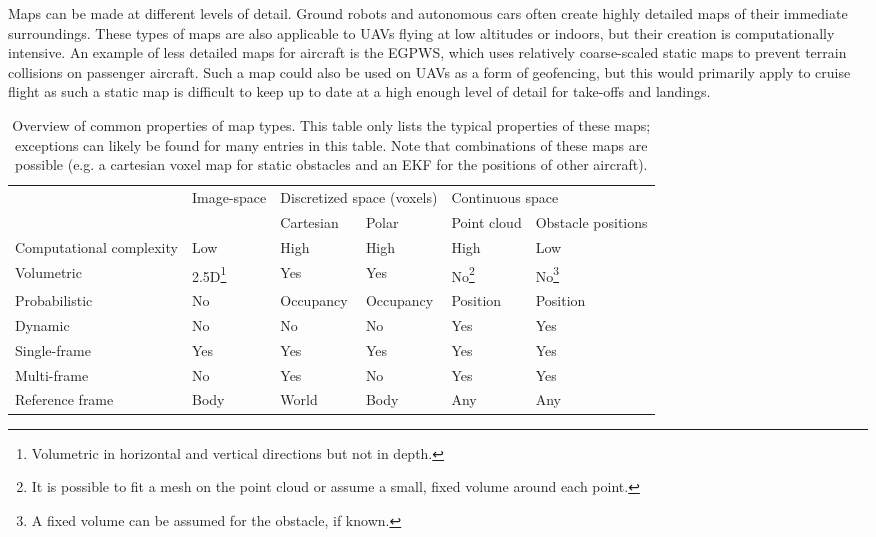 Maps can be made at different levels of detail.
Ground robots and autonomous cars often create highly detailed maps of their immediate surroundings.
These types of maps are also applicable to \acp{UAV} flying at low altitudes or indoors, but their creation is computationally intensive.
An example of less detailed maps for aircraft is the \acf{EGPWS}, which uses relatively coarse-scaled static maps to prevent terrain collisions on passenger aircraft.
Such a map could also be used on \acp{UAV} as a form of geofencing, but this would primarily apply to cruise flight as such a static map is difficult to keep up to date at a high enough level of detail for take-offs and landings.

\begin{table}
\centering
\caption{Overview of common properties of map types. This table only lists the typical properties of these maps; exceptions can likely be found for many entries in this table. Note that combinations of these maps are possible (e.g. a cartesian voxel map for static obstacles and an \acs{EKF} for the positions of other aircraft).}
\label{tab:maps}
\let\oldfootnoterule\footnoterule
\renewcommand\footnoterule{\vspace{-0.5em}}
\begin{minipage}{\textwidth}
\small
\begin{tabular}{llllll}
\toprule
& Image-space & \multicolumn{2}{l}{Discretized space (voxels)} & \multicolumn{2}{l}{Continuous space} \\
\cmidrule(lr){3-4} \cmidrule(lr){5-6}
&& Cartesian & Polar & Point cloud & Obstacle positions \\
\midrule
Computational complexity & Low & High & High & High & Low \\
Volumetric & 2.5D\footnote{Volumetric in horizontal and vertical directions but not in depth.} & Yes & Yes & No\footnote{It is possible to fit a mesh on the point cloud or assume a small, fixed volume around each point.} & No\footnote{A fixed volume can be assumed for the obstacle, if known.} \\
Probabilistic & No & Occupancy & Occupancy & Position & Position \\
Dynamic & No & No & No & Yes & Yes \smallskip\\
Single-frame & Yes & Yes & Yes & Yes & Yes \\
Multi-frame & No & Yes & No & Yes & Yes \\
Reference frame & Body & World & Body & Any & Any \\
\bottomrule
\end{tabular}
\end{minipage}
\renewcommand\footnoterule{\oldfootnoterule}
\end{table}

